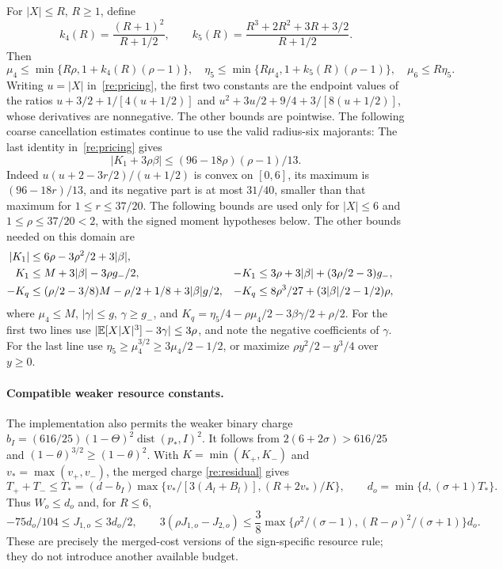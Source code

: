 For $|X|\le R$, $R\ge1$, define
\[
 k_4(R)=\frac{(R+1)^2}{R+1/2},\qquad
 k_5(R)=\frac{R^3+2R^2+3R+3/2}{R+1/2}.
\]
Then
\begin{equation}\label{mom:universal-moments}
 \mu_4\le\min\{R\rho,1+k_4(R)(\rho-1)\},\quad
 \eta_5\le\min\{R\mu_4,1+k_5(R)(\rho-1)\},\quad
 \mu_6\le R\eta_5.
\end{equation}
Writing $u=|X|$ in~\eqref{re:pricing}, the first two constants
are the endpoint values of the ratios
$u+3/2+1/[4(u+1/2)]$ and
$u^2+3u/2+9/4+3/[8(u+1/2)]$, whose derivatives are nonnegative.
The other bounds are pointwise. The following coarse cancellation estimates
continue to use the valid radius-six majorants:
The last identity in~\eqref{re:pricing} gives
\begin{equation}\label{mom:K-cancellation}
 |K_1+3\rho\beta|\le(96-18\rho)(\rho-1)/13.
\end{equation}
Indeed $u(u+2-3r/2)/(u+1/2)$ is convex on $[0,6]$, its maximum is
$(96-18r)/13$, and its negative part is at most $31/40$, smaller than that
maximum for $1\le r\le37/20$.
The following bounds are used only for $|X|\le6$ and
$1\le\rho\le37/20<2$, with the signed moment hypotheses below.
The other bounds needed on this domain are
\begin{align}
 |K_1|&\le6\rho-3\rho^2/2+3|\beta|,\notag\\
 K_1&\le M+3|\beta|-3\rho g_-/2,&
 -K_1&\le3\rho+3|\beta|+(3\rho/2-3)g_-,\notag\\
 -K_q&\le(\rho/2-3/8)M-\rho/2+1/8+3|\beta|g/2,&
 -K_q&\le8\rho^3/27+(3|\beta|/2-1/2)\rho,               \label{mom:K-bounds}
\end{align}
where $\mu_4\le M$, $|\gamma|\le g$, $\gamma\ge g_-$, and
$K_q=\eta_5/4-\rho\mu_4/2-3\beta\gamma/2+\rho/2$.
For the first two lines use
$|\mathbb E[X|X|^3]-3\gamma|\le3\rho$, and note the negative coefficients
of $\gamma$. For the last line use
$\eta_5\ge\mu_4^{3/2}\ge3\mu_4/2-1/2$, or maximize
$\rho y^2/2-y^3/4$ over $y\ge0$.


\paragraph{Compatible weaker resource constants.}
The implementation also permits the weaker binary charge
$b_I=(616/25)(1-\Theta)^2\operatorname{dist}(p_*,I)^2$.
It follows from $2(6+2\sigma)>616/25$ and
$(1-\theta)^{3/2}\ge(1-\theta)^2$.
With $K=\min(K_+,K_-)$ and $v_* =\max(v_+,v_-)$, the merged charge
\eqref{re:residual} gives
\[
 T_++T_-\le T_*=(d-b_I)\max\{v_*/[3(A_l+B_l)],(R+2v_*)/K\},
 \qquad d_o=\min\{d,(\sigma+1)T_*\}.
\]
Thus $W_o\le d_o$ and, for $R\le6$,
\[
 -75d_o/104\le J_{1,o}\le3d_o/2,\qquad
 3(\rho J_{1,o}-J_{2,o})\le\frac38
 \max\{\rho^2/(\sigma-1),(R-\rho)^2/(\sigma+1)\}d_o.
\]
These are precisely the merged-cost versions of the sign-specific
resource rule; they do not introduce another available budget.

